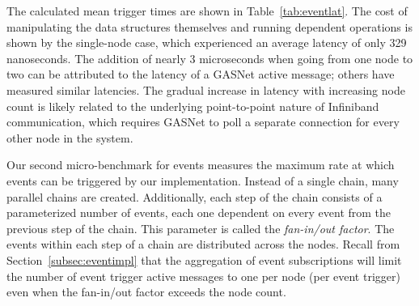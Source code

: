 
The calculated mean trigger times are shown in Table~\ref{tab:eventlat}.
The cost of manipulating the data structures themselves and running dependent
operations is shown by the single-node case, which experienced an average
latency of only 329 nanoseconds.  The addition of nearly 3 microseconds when
going from one node to two can be attributed to the latency of a GASNet
active message; others have measured similar latencies\cite{GASNET06}.
The gradual increase in latency with increasing node count is likely 
related to the underlying point-to-point nature of Infiniband communication,
which requires GASNet to poll a separate connection for every other node in
the system.

Our second micro-benchmark for events measures the maximum rate at which events can
be triggered by our implementation.  Instead of a single chain, many parallel chains
are created.  Additionally, each step of the chain consists of a parameterized number
of events, each one dependent on every event from the previous step of the chain.
This parameter is called the {\em fan-in/out factor}.  The events within each step of
a chain are distributed across the nodes.  Recall from Section~\ref{subsec:eventimpl}
that the aggregation of event subscriptions
will limit the number of event trigger active messages to one per node (per event trigger)
even when the fan-in/out factor exceeds the node count.


